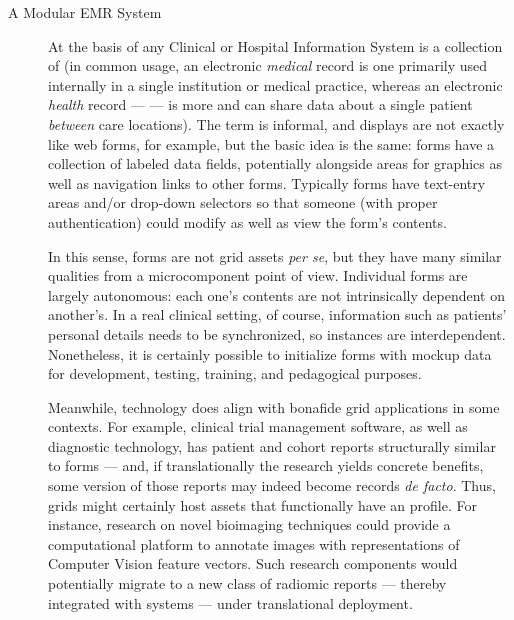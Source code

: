 \documentclass[11pt]{article}
\begin{document}
{\begin{description}
\item[A Modular EMR System]  At the basis of any Clinical or Hospital Information 
System is a collection of \EMR{}  (in common usage, an 
electronic \textit{medical} record is one primarily used internally 
in a single institution or medical practice, whereas an electronic 
\textit{health} record --- \EHR{} --- is more  
and can share data about a single patient \textit{between} care 
locations).  The term  is informal, and \EMR{} displays 
are not exactly like web forms, for example, but the 
basic idea is the same: forms have a collection of labeled 
data fields, potentially alongside areas for graphics as well 
as navigation links to other forms.  Typically forms have 
text-entry areas and/or drop-down selectors so that 
someone (with proper authentication) could modify as well as 
view the form's contents.

\pseudoIndent{} In this sense, \GUI{} forms are not grid assets \textit{per se}, 
but they have many similar qualities from a microcomponent 
point of view.  Individual forms are largely autonomous: each 
one's contents are not intrinsically dependent on another's.  
In a real clinical setting, of course, information such as 
patients' personal details needs to be synchronized, so \EMR{} instances  
are interdependent.  Nonetheless, it is certainly possible to initialize forms 
with mockup data for development, testing, training, and pedagogical purposes.

\pseudoIndent{} Meanwhile, \EMR{} technology does align with bonafide grid 
applications in some contexts.  For example, clinical 
trial management software, as well as diagnostic technology, 
has patient and cohort reports structurally 
similar to \EMR{} forms --- and, if translationally the 
research yields concrete benefits, some version 
of those reports may indeed become \EMR{} records 
\textit{de facto}.  Thus, \FAIR{} grids might certainly 
host assets that functionally have an \EMR{} profile.  
For instance, research on novel bioimaging techniques 
could provide a computational platform to annotate 
images with representations of Computer Vision feature 
vectors.  Such research components would potentially 
migrate to a new class of radiomic reports 
--- thereby integrated with \EMR{} systems --- under 
translational deployment.     

\end{description}

\vspace*{5pt}

}
\end{document}
